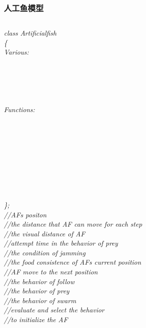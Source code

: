 \begin{frame}
	\frametitle{人工鱼模型}
	\begin{columns}
	\flushleft
		\small{\emph{{class Artificial\underline{\hspace{0.5em}}fish}\\{\{}\\Various:\\{}\\{}\\{}\\{}\\{}\\{Functions:}\\{}\\{}\\{}\\{}\\{}\\{}\\{}\\{}\\{}\\{\};}}}
	\flushleft
		\small{\emph{ \vspace{0.5ex}\\{//AFs positon}\\//the distance that AF can move for each step\\//the visual distance of AF\\//attempt time in the behavior of prey\\//the condition of jamming\vspace{3ex}\\//the food consistence of AFs current position\\//AF move to the next position\\//the behavior of follow\\//the behavior of prey\\//the behavior of swarm\\//evaluate and select the behavior\\//to initialize the AF\vspace{3ex} }}

\end{columns}
\end{frame}
